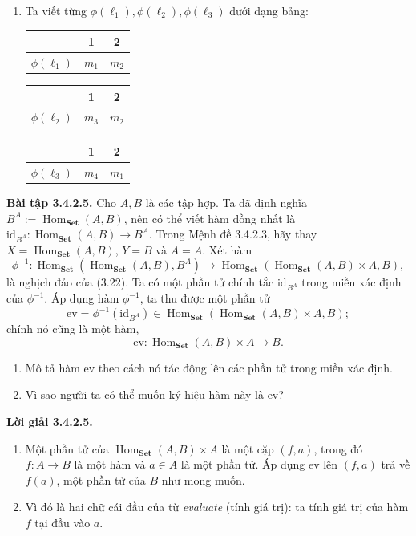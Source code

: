 \begin{enumerate}[label=\alph*.]
\item Ta viết từng $\phi(\ell_1),\phi(\ell_2),\phi(\ell_3)$ dưới dạng bảng:
\begin{center}\begin{tabular}{c|cc}&1&2\\\hline$\phi(\ell_1)$&$m_1$&$m_2$\end{tabular}\quad\begin{tabular}{c|cc}&1&2\\\hline$\phi(\ell_2)$&$m_3$&$m_2$\end{tabular}\quad\begin{tabular}{c|cc}&1&2\\\hline$\phi(\ell_3)$&$m_4$&$m_1$\end{tabular}\end{center}
\end{enumerate}

\noindent\textbf{Bài tập 3.4.2.5.} Cho $A,B$ là các tập hợp. Ta đã định nghĩa $B^A:=\operatorname{Hom}_{\mathbf{Set}}(A,B)$, nên có thể viết hàm đồng nhất là $\mathrm{id}_{B^A}:\operatorname{Hom}_{\mathbf{Set}}(A,B)\to B^A$. Trong Mệnh đề 3.4.2.3, hãy thay $X=\operatorname{Hom}_{\mathbf{Set}}(A,B)$, $Y=B$ và $A=A$. Xét hàm
\[\phi^{-1}:\operatorname{Hom}_{\mathbf{Set}}(\operatorname{Hom}_{\mathbf{Set}}(A,B),B^A)\to\operatorname{Hom}_{\mathbf{Set}}(\operatorname{Hom}_{\mathbf{Set}}(A,B)\times A,B),\]
là nghịch đảo của (3.22). Ta có một phần tử chính tắc $\mathrm{id}_{B^A}$ trong miền xác định của $\phi^{-1}$. Áp dụng hàm $\phi^{-1}$, ta thu được một phần tử
\[\mathrm{ev}=\phi^{-1}(\mathrm{id}_{B^A})\in\operatorname{Hom}_{\mathbf{Set}}(\operatorname{Hom}_{\mathbf{Set}}(A,B)\times A,B);\]
chính nó cũng là một hàm,
\begin{equation*}\mathrm{ev}:\operatorname{Hom}_{\mathbf{Set}}(A,B)\times A\to B.\tag{3.23}\end{equation*}
\begin{enumerate}[label=\alph*.]
\item Mô tả hàm $\mathrm{ev}$ theo cách nó tác động lên các phần tử trong miền xác định.
\item Vì sao người ta có thể muốn ký hiệu hàm này là $\mathrm{ev}$?
\end{enumerate}
\noindent\textbf{Lời giải 3.4.2.5.}\keepwithnext
\begin{enumerate}[label=\alph*.]
\item Một phần tử của $\operatorname{Hom}_{\mathbf{Set}}(A,B)\times A$ là một cặp $(f,a)$, trong đó $f:A\to B$ là một hàm và $a\in A$ là một phần tử. Áp dụng $\mathrm{ev}$ lên $(f,a)$ trả về $f(a)$, một phần tử của $B$ như mong muốn.
\item Vì đó là hai chữ cái đầu của từ \emph{evaluate} (tính giá trị): ta tính giá trị của hàm $f$ tại đầu vào $a$.
\end{enumerate}

